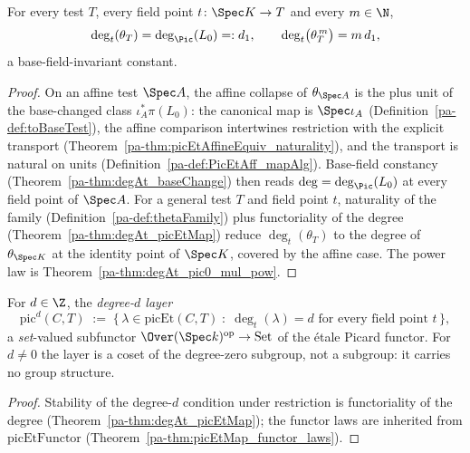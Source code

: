 \begin{theorem}
  \label{pa-thm:degAt_thetaFamily}
  \leanok

  For every test \(T\), every field point \(t \colon \Spec K \to T\) and every \(m \in \N\),
  \[
    \deg_t(\theta_T) = \deg_{\Pic}(L_0) =: d_1,
    \qquad
    \deg_t\bigl(\theta_T^{\,m}\bigr) = m \, d_1 ,
  \]
  a base-field-invariant constant.
\end{theorem}
\begin{proof}
  \leanok
  On an affine test \(\Spec A\), the affine collapse of \(\theta_{\Spec A}\) is the plus unit
  of the base-changed class \(\iota_A^{*}\pi(L_0)\): the canonical map is \(\Spec\iota_A\)
  (Definition~\ref{pa-def:toBaseTest}), the affine comparison intertwines restriction with the
  explicit transport (Theorem~\ref{pa-thm:picEtAffineEquiv_naturality}), and the transport is
  natural on units (Definition~\ref{pa-def:PicEtAff_mapAlg}). Base-field constancy
  (Theorem~\ref{pa-thm:degAt_baseChange}) then reads \(\deg = \deg_{\Pic}(L_0)\) at every field
  point of \(\Spec A\). For a general test \(T\) and field point \(t\), naturality of the
  family (Definition~\ref{pa-def:thetaFamily}) plus functoriality of the degree
  (Theorem~\ref{pa-thm:degAt_picEtMap}) reduce \(\deg_t(\theta_T)\) to the degree of
  \(\theta_{\Spec K}\) at the identity point of \(\Spec K\), covered by the affine case.
  The power law is Theorem~\ref{pa-thm:degAt_pic0_mul_pow}.
\end{proof}

\begin{definition}
  \label{pa-def:picDegLayerFunctor}
  \leanok

  For \(d \in \Z\), the \emph{degree-\(d\) layer}
  \[
    \mathrm{pic}^{d}(C,T) \;:=\;
    \bigl\{\, \lambda \in \mathrm{picEt}(C,T) \;:\; \deg_t(\lambda) = d
      \text{ for every field point } t \,\bigr\},
  \]
  a \emph{set}-valued subfunctor \(\Over(\Spec k)^{\mathrm{op}} \to \mathrm{Set}\) of the
  \'etale Picard functor. For \(d \neq 0\) the layer is a coset of the degree-zero subgroup,
  not a subgroup: it carries no group structure.
\end{definition}
\begin{proof}
  \leanok
  Stability of the degree-\(d\) condition under restriction is functoriality of the degree
  (Theorem~\ref{pa-thm:degAt_picEtMap}); the functor laws are inherited from
  \(\mathrm{picEtFunctor}\) (Theorem~\ref{pa-thm:picEtMap_functor_laws}).
\end{proof}

